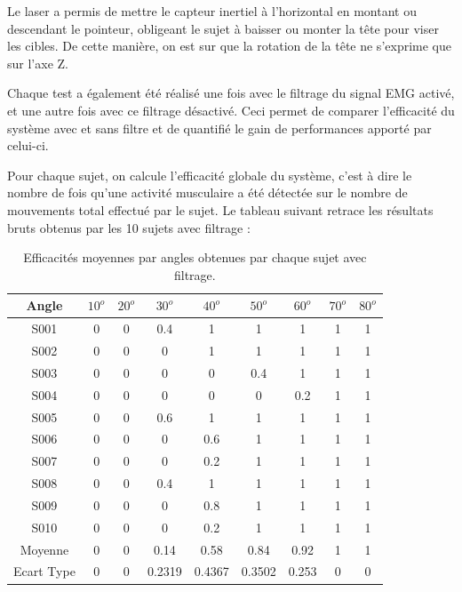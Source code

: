 \documentclass[letterpaper, twoside, 12pt, memoire, creativecommons, hyperref]{thETS}
\begin{document}
Le laser a permis de mettre le capteur inertiel à l'horizontal en montant ou descendant le pointeur, obligeant le sujet à baisser ou monter la tête pour viser les cibles. De cette manière, on est sur que la rotation de la tête ne s'exprime que sur l'axe Z.

Chaque test a également été réalisé une fois avec le filtrage du signal EMG activé, et une autre fois avec ce filtrage désactivé. Ceci permet de comparer l'efficacité du système avec et sans filtre et de quantifié le gain de performances apporté par celui-ci.

Pour chaque sujet, on calcule l'efficacité globale du système, c'est à dire le nombre de fois qu'une activité musculaire a été détectée sur le nombre de mouvements total effectué par le sujet. Le tableau suivant retrace les résultats bruts obtenus par les 10 sujets avec filtrage : 

\begin{table}[ht]
	\caption{Efficacités moyennes par angles obtenues par chaque sujet avec filtrage. }
		\begin{tabular}{|c|c|c|c|c|c|c|c|c|}
		\hline
			Angle & $10^{o}$ & $20^{o}$ & $30^{o}$ & $40^{o}$ & $50^{o}$ & $60^{o}$ & $70^{o}$ & $80^{o}$\\
	    \hline
	    		S001 & 0 & 0 & 0.4 & 1 & 1 & 1 & 1 & 1\\
	    \hline
			S002 & 0 & 0 & 0 & 1 & 1 & 1 & 1 & 1\\
	    \hline
	    		S003 & 0 & 0 & 0 & 0 & 0.4 & 1 & 1 & 1\\
	    \hline
	    		S004 & 0 & 0 & 0 & 0 & 0 & 0.2 & 1 & 1\\
	    \hline
	    		S005 & 0 & 0 & 0.6 & 1 & 1 & 1 & 1 & 1\\
	    \hline
	    		S006 & 0 & 0 & 0 & 0.6 & 1 & 1 & 1 & 1\\
	    \hline
	    		S007 & 0 & 0 & 0 & 0.2 & 1 & 1 & 1 & 1\\
	    \hline
	    		S008 & 0 & 0 & 0.4 & 1 & 1 & 1 & 1 & 1\\
	    \hline
	    		S009 & 0 & 0 & 0 & 0.8 & 1 & 1 & 1 & 1\\
	    \hline
	    		S010 & 0 & 0 & 0 & 0.2 & 1 & 1 & 1 & 1\\
	    \hline
	    		Moyenne & 0 & 0 & 0.14 & 0.58 & 0.84 & 0.92 & 1 & 1\\
	    \hline
	    		Ecart Type & 0 & 0 & 0.2319 & 0.4367 & 0.3502 & 0.253 & 0 & 0\\
	    \hline
		\end{tabular}
	\label{tab:effangles}
\end{table}
\end{document}
